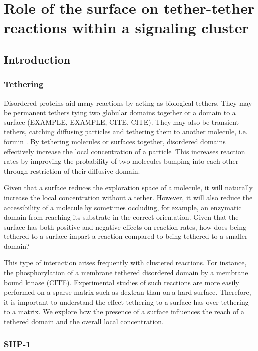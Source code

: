 \documentclass[../../AdvancementSummary.tex]{subfiles}
\begin{document}
\section{Role of the surface on tether-tether reactions within a signaling cluster}

\subsection{Introduction}
\subsubsection{Tethering}

Disordered proteins aid many reactions by acting as biological tethers. They may be permanent tethers tying two globular domains together or a domain to a surface (EXAMPLE, EXAMPLE, CITE, CITE).  They may also be transient tethers, catching diffusing particles and tethering them to another molecule, i.e. formin \cite{Bryant2017}. By tethering molecules or surfaces together, disordered domains effectively increase the local concentration of a particle. This increases reaction rates by improving the probability of two molecules bumping into each other through restriction of their diffusive domain.

Given that a surface reduces the exploration space of a molecule, it will naturally increase the local concentration without a tether. However, it will also reduce the accessibility of a molecule by sometimes occluding, for example, an enzymatic domain from reaching its substrate in the correct orientation. Given that the surface has both positive and negative effects on reaction rates, how does being tethered to a surface impact a reaction compared to being tethered to a smaller domain? 

This type of interaction arises frequently with clustered reactions.  For instance, the phosphorylation of a membrane tethered disordered domain by a membrane bound kinase (CITE).  Experimental studies of such reactions are more easily performed on a sparse matrix such as dextran than on a hard surface. Therefore, it is important to understand the effect tethering to a surface has over tethering to a matrix. We explore how the presence of a surface influences the reach of a tethered domain and the overall local concentration.

\subsubsection{SHP-1}
\end{document}
